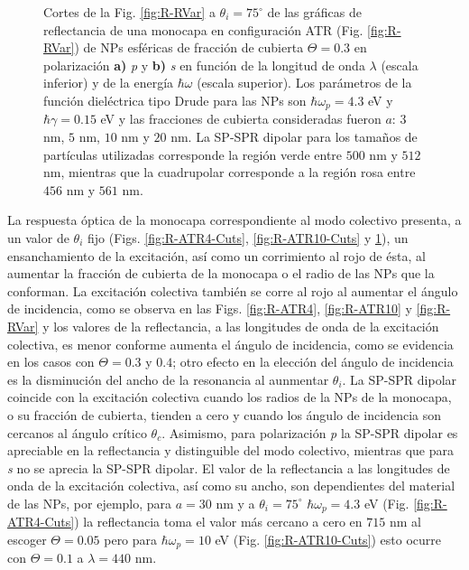 \begin{figure}[h!]
	\caption{Cortes de la Fig. \ref{fig:R-RVar} a $\theta_i = 75^\circ$ de las gráficas de reflectancia de una monocapa en configuración ATR (Fig. \ref{fig:R-RVar}) de NPs esféricas de fracción de cubierta $\Theta = 0.3$ en polarización \textbf{a)} \emph{p} y \textbf{b)} \emph{s} en función de la longitud de onda $\lambda$ (escala inferior) y de la energía $\hbar\omega$ (escala superior). Los parámetros de la función dieléctrica tipo Drude para las NPs son $\hbar\omega_p = 4.3$ eV y $\hbar\gamma = 0.15$ eV y las fracciones de cubierta consideradas fueron $a$: $3$ nm, $5$ nm, $10$ nm y $20$ nm. La SP-SPR dipolar para los tamaños de partículas utilizadas corresponde la región verde entre $500$ nm y $512$ nm, mientras que la cuadrupolar corresponde a la región rosa entre $456$ nm y $561$ nm.}\label{fig:R-RVar-Cuts}
	\end{figure}	

La respuesta óptica de la monocapa correspondiente al modo colectivo presenta, a un valor de $\theta_i$ fijo (Figs. \ref{fig:R-ATR4-Cuts}, \ref{fig:R-ATR10-Cuts} y \ref{fig:R-RVar-Cuts}), un ensanchamiento de la excitación, así como un corrimiento al rojo de ésta, al aumentar la fracción de cubierta de la monocapa o el radio de las NPs que la conforman. La excitación colectiva también se corre al rojo al aumentar el ángulo de incidencia, como se observa en las Figs. \ref{fig:R-ATR4}, \ref{fig:R-ATR10} y \ref{fig:R-RVar} y los  valores de la reflectancia, a las longitudes de onda de la excitación colectiva, es menor conforme aumenta el ángulo de incidencia, como se evidencia en los casos con $\Theta=0.3$ y $0.4$; otro efecto en la elección del ángulo de incidencia es la disminución del ancho de la resonancia al aunmentar $\theta_i$. La SP-SPR dipolar coincide con la excitación colectiva cuando los radios de la NPs de la monocapa, o su fracción de cubierta, tienden a cero y cuando los ángulo de incidencia son cercanos al ángulo crítico $\theta_c$. Asimismo, para polarización \emph{p} la SP-SPR dipolar es apreciable en la reflectancia y distinguible del modo colectivo, mientras que para \emph{s} no se aprecia la SP-SPR dipolar.  El valor de la reflectancia a las longitudes de onda de la excitación colectiva, así como su ancho, son dependientes del material de las NPs, por ejemplo, para  $a=30$ nm y a $\theta_i=75^\circ$ $\hbar\omega_p=4.3$ eV (Fig. \ref{fig:R-ATR4-Cuts}) la reflectancia toma el valor más cercano a cero en $715$ nm al escoger  $\Theta=0.05$ pero para $\hbar\omega_p=10$ eV (Fig. \ref{fig:R-ATR10-Cuts}) esto ocurre con $\Theta=0.1$ a $\lambda=440$ nm. 

